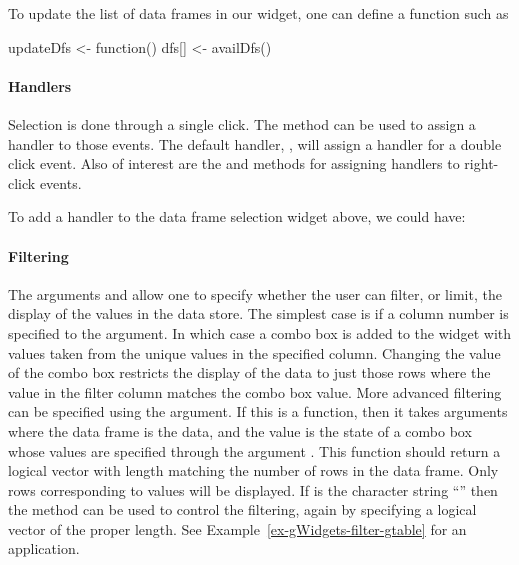 To update the list of data frames in our  widget, one can define a function such as
\begin{Schunk}
\begin{Sinput}
 updateDfs <- function() {
   dfs[] <- availDfs()
 }
\end{Sinput}
\end{Schunk}


\paragraph{Handlers}
Selection is done through a single click. The 
method can be used to assign a handler to those events. The default
handler, , will assign a
handler for a double click event. Also of interest are the
 and
 methods for assigning handlers
to right-click events.


To add a handler to the data frame selection widget above, we could have:
\begin{Schunk}
\end{Schunk}



\paragraph{Filtering}
The arguments  and
 allow one to specify whether the user
can filter, or limit, the display of the values in the data store. The
simplest case is if a column number is specified to the
 argument. In which case a combo box is added to
the widget with values taken from the unique values in the specified
column. Changing the value of the combo box restricts the display of
the data to just those rows where the value in the filter column
matches the combo box value. More advanced filtering can be specified
using the  argument. If this is a
function, then it takes arguments 
where the data frame is the data, and the  value is
the state of a combo box whose values are specified through the
argument . This function should return
a logical vector with length matching the number of rows in the data
frame.  Only rows corresponding to  values will be
displayed. If  is the character string
``'' then the  method can
be used to control the filtering, again by specifying a logical vector
of the proper length. See Example~\ref{ex-gWidgets-filter-gtable} for
an application.


